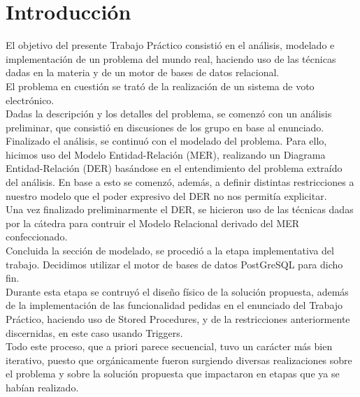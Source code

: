 \section{Introducción}

\indent \indent El objetivo del presente Trabajo Práctico consistió en el análisis, modelado e implementación de un problema del mundo real, haciendo uso de las técnicas dadas en la materia y de un motor de bases de datos relacional.\\
\indent El problema en cuestión se trató de la realización de un sistema de voto electrónico.\\
\indent Dadas la descripción y los detalles del problema, se comenzó con un análisis preliminar, que consistió en discusiones de los grupo en base al enunciado.\\
\indent Finalizado el análisis, se continuó con el modelado del problema. Para ello, hicimos uso del Modelo Entidad-Relación (MER), realizando un Diagrama Entidad-Relación (DER) basándose en el entendimiento del problema extraído del análisis. En base a esto se comenzó, además, a definir distintas restricciones a nuestro modelo que el poder expresivo del DER no nos permitía explicitar.\\
\indent Una vez finalizado preliminarmente el DER, se hicieron uso de las técnicas dadas por la cátedra para contruir el Modelo Relacional derivado del MER confeccionado.\\
\indent Concluida la sección de modelado, se procedió a la etapa implementativa del trabajo. Decidimos utilizar el motor de bases de datos PostGreSQL para dicho fin.\\
\indent Durante esta etapa se contruyó el diseño físico de la solución propuesta, además de la implementación de las funcionalidad pedidas en el enunciado del Trabajo Práctico, haciendo uso de Stored Procedures, y de la restricciones anteriormente discernidas, en este caso usando Triggers.\\
\indent Todo este proceso, que a priori parece secuencial, tuvo un carácter más bien iterativo, puesto que orgánicamente fueron surgiendo diversas realizaciones sobre el problema y sobre la solución propuesta que impactaron en etapas que ya se habían realizado.\\
